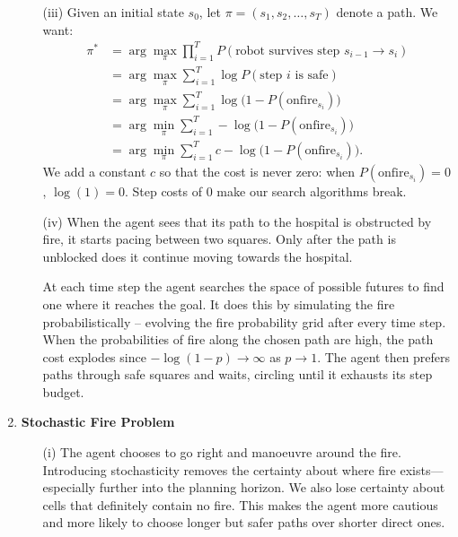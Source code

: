 \documentclass{64110}
\begin{document}
\begin{enumerate}
\begin{enumerate}
\item[(iii)]
Given an initial state $s_0$, let $\pi = (s_1, s_2, \ldots, s_T)$ denote a path.
We want:
\begin{align*}
\pi^* &= \arg\max_\pi \prod_{i=1}^{T} P(\text{robot survives step } s_{i-1} \to s_i) \\
      &= \arg\max_\pi \sum_{i=1}^{T} \log P(\text{step } i \text{ is safe}) \\
      &= \arg\max_\pi \sum_{i=1}^{T} \log\bigl(1 - P(\text{onfire}_{s_i})\bigr) \\
      &= \arg\min_\pi \sum_{i=1}^{T} -\log\bigl(1 - P(\text{onfire}_{s_i})\bigr) \\
      &= \arg\min_\pi \sum_{i=1}^{T} c - \log\bigl(1 - P(\text{onfire}_{s_i})\bigr).
\end{align*}
We add a constant $c$ so that the cost is never zero: when $P(\text{onfire}_{s_i}) = 0$,
$\log(1) = 0$. Step costs of 0 make our search algorithms break.

\item[(iv)]
When the agent sees that its path to the hospital is obstructed by fire, it starts
pacing between two squares. Only after the path is unblocked does it continue moving
towards the hospital.

At each time step the agent searches the space of possible futures to find one where it
reaches the goal. It does this by simulating the fire probabilistically -- evolving the
fire probability grid after every time step. When the probabilities of fire along the
chosen path are high, the path cost explodes since $-\log(1-p) \to \infty$ as $p \to 1$.
The agent then prefers paths through safe squares and waits, circling until it exhausts
its step budget.

\end{enumerate}


\item \textbf{Stochastic Fire Problem}

\begin{enumerate}

\item[(i)]
The agent chooses to go right and manoeuvre around the fire. Introducing stochasticity
removes the certainty about where fire exists---especially further into the planning
horizon. We also lose certainty about cells that definitely contain no fire. This makes
the agent more cautious and more likely to choose longer but safer paths over shorter
direct ones.


\end{enumerate}
\end{enumerate}
\end{document}
